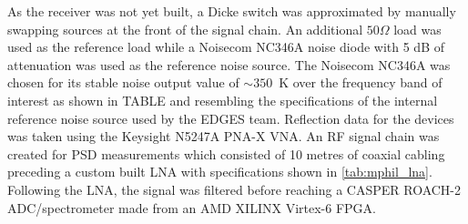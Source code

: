 As the receiver was not yet built, a Dicke switch was approximated by manually swapping sources at the front of the signal chain. An additional $50 \Omega$ load was used as the reference load while a Noisecom NC346A noise diode with 5 dB of attenuation was used as the reference noise source. The Noisecom NC346A was chosen for its stable noise output value of \mbox{$\sim 350$ K} over the frequency band of interest as shown in TABLE and resembling the specifications of the internal reference noise source used by the EDGES team. Reflection data for the devices was taken using the Keysight N5247A PNA-X VNA. An RF signal chain was created for PSD measurements which consisted of 10 metres of coaxial cabling preceding a custom built LNA with specifications shown in \cref{tab:mphil_lna}. Following the LNA, the signal was filtered before reaching a CASPER ROACH-2 ADC/spectrometer made from an AMD XILINX Virtex-6 FPGA.

